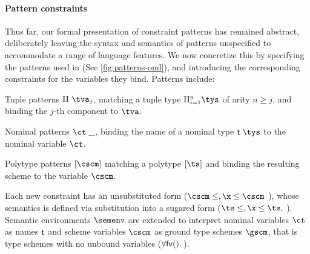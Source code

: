 \documentclass[acmsmall,screen,nonacm,review]{acmart}
\begin{document}
\paragraph{Pattern constraints}

Thus far, our formal presentation of constraint patterns has remained
abstract, deliberately leaving the syntax and semantics of patterns unspecified to
accommodate a range of language features. We now concretize this by specifying
the patterns used in \OML (See \cref{fig:patterns-oml}), and introducing the
corresponding constraints for the variables they bind.
%
Patterns include:
\begin{enumerate*}

  \item Tuple patterns $\cpatprod \tv j$, matching a tuple type $\Pi\iton
    \tys$ of arity $n \geq j$, and binding the $j$-th component to $\tv$.

  \item Nominal patterns $\cpatrcd \ct$, binding the name of a nominal type
    $\Tapp \tys$ to the nominal variable $\ct$.

  \item Polytype patterns $\cpatpoly \cscm$ matching a polytype $\tpoly \ts$ and
    binding the resulting scheme to the variable $\cscm$.

\end{enumerate*}

Each new constraint has an unsubstituted form ($\cscm \leq \t, \x \leq \cscm$
\etc), whose semantics is defined via substitution into a sugared form ($\ts
\leq \t, \x \leq \ts,$ \etc). Semantic environments $\semenv$ are extended to
interpret nominal variables $\ct$ as names $\mathopen{}\mathrel{\mathsf{t}}$ and scheme variables $\cscm$ as
ground type schemes $\gscm$, that is type schemes with no unbound variables
(\ie $\forall {\mathsf{fv}({\relax})}.\,{\relax}$).
\end{document}
